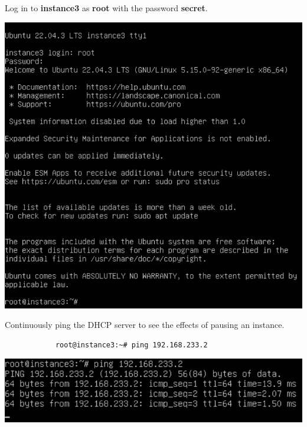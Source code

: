 \documentclass[letterpaper, 12pt]{article}
\begin{document}
\begin{enumerate}
    \begin{labstep}
        Log in to \textbf{instance3} as \textbf{root} with the password \textbf{secret}.

        \begin{center}
            \includegraphics[width=\linewidth]{images/part4/step3.png}
        \end{center}
    \end{labstep}

    \begin{labstep}
        Continuously ping the DHCP server to see the effects of pausing an instance.
        \begin{lstlisting}
            root@instance3:~# ping 192.168.233.2
        \end{lstlisting}

        \begin{center}
            \includegraphics[width=\linewidth]{images/part4/step4.png}
        \end{center}
    \end{labstep}


\end{enumerate}
\end{document}
